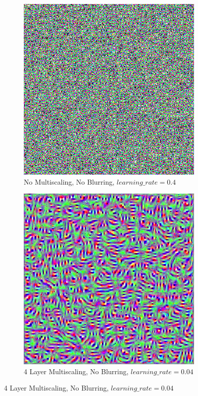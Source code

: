 \begin{figure}
    \captionsetup{justification=centering}

    \begin{subfigure}[t]{0.31\textwidth}
        \captionsetup{justification=centering}
        \centering
        \includegraphics[width=.7\linewidth]{figuras/feat_vis/experiments/layers/initial/l3/random_image_pl1_lr4e-1_layer5_no-blur.png}
        \caption{No Multiscaling, No Blurring, \(learning\_rate = 0.4\)}
    \end{subfigure}
    \hfill
    \begin{subfigure}[t]{0.31\textwidth}
        \captionsetup{justification=centering}
        \centering
        \includegraphics[width=.7\linewidth]{figuras/feat_vis/experiments/layers/initial/l3/random_image_pl4_lr4e-2_layer5_no-blur.png}
        \caption{4 Layer Multiscaling, No Blurring, \(learning\_rate = 0.04\)}

\end{subfigure}
\end{figure}
